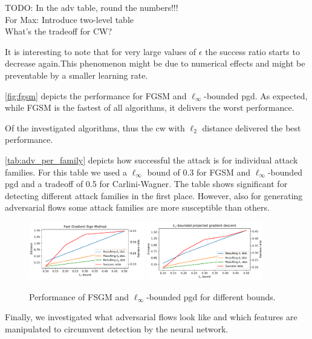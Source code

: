 \documentclass[conference]{IEEEtran}
\newcommand\note[2]{{\color{#1}#2}}
\newcommand\todo[1]{{\note{red}{TODO: #1}}}
\begin{document}
\begin{table}
\begin{tabular}{lllllllll}
\end{tabular}

\todo{In the adv table, round the numbers!!! \\
For Max: Introduce two-level table\\
What's the tradeoff for CW?}
\end{table}

It is interesting to note that for very large values of $\epsilon$ the success ratio starts to decrease again.This phenomenon might be due to numerical effects and might be preventable by a smaller learning rate.


\autoref{fig:fgsm} depicts the performance for FGSM and $\ell_\infty$-bounded \gls{pgd}. As expected, while FGSM is the fastest of all algorithms, it delivers the worst performance.

Of the investigated algorithms, thus the \gls{cw} with $\ell_2$ distance delivered the best performance.

\autoref{tab:adv_per_family} depicts how successful the attack is for individual attack families. For this table we used a $\ell_\infty$ bound of 0.3 for FGSM and $\ell_\infty$-bounded \gls{pgd} and a tradeoff of 0.5 for Carlini-Wagner. The table shows significant for detecting different attack families in the first place. However, also for generating adversarial flows some attack families are more susceptible than others.

\begin{figure}
\includegraphics[width=0.45\textwidth]{adv_plots/fgsm.pdf}
\includegraphics[width=0.45\textwidth]{adv_plots/l_inf_pgd.pdf}
\caption{Performance of FSGM and $\ell_\infty$-bounded \gls{pgd} for different bounds.}
\label{fig:fgsm}
\end{figure}

Finally, we investigated what adversarial flows look like and which features are manipulated to circumvent detection by the neural network.
\end{document}
